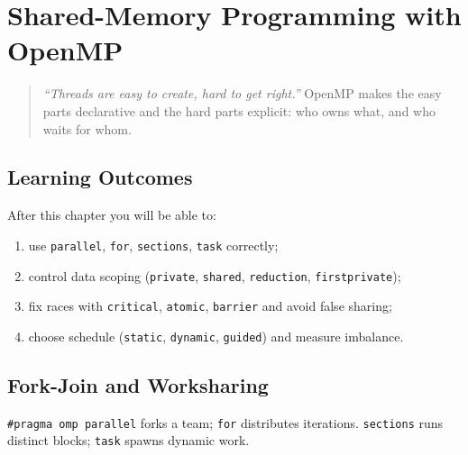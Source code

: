 \chapter{Shared-Memory Programming with OpenMP}\label{ch:openmp}

\begin{quote}
\emph{``Threads are easy to create, hard to get right.''} OpenMP makes the easy parts declarative and the hard parts explicit: who owns what, and who waits for whom.
\end{quote}

\noindent{}

\section*{Learning Outcomes}
After this chapter you will be able to:
\begin{enumerate}[label=(L\arabic*)]
    \item use \texttt{parallel}, \texttt{for}, \texttt{sections}, \texttt{task} correctly;
    \item control data scoping (\texttt{private}, \texttt{shared}, \texttt{reduction}, \texttt{firstprivate});
    \item fix races with \texttt{critical}, \texttt{atomic}, \texttt{barrier} and avoid false sharing;
    \item choose schedule (\texttt{static}, \texttt{dynamic}, \texttt{guided}) and measure imbalance.
\end{enumerate}

\section{Fork-Join and Worksharing}\label{sec:forkjoin}
\texttt{\#pragma omp parallel} forks a team; \texttt{for} distributes iterations. \texttt{sections} runs distinct blocks; \texttt{task} spawns dynamic work.

